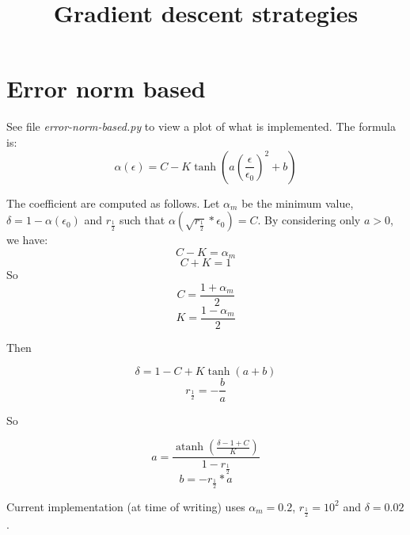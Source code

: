 \documentclass {article}
\title {Gradient descent strategies}
\newcommand{\rhalf}{r_{\frac{1}{2}}}
\newcommand{\atanh}{\operatorname{atanh}}
\begin{document}
\maketitle

\section {Error norm based}

See file \emph{error-norm-based.py} to view a plot of what is implemented.
The formula is:
$$
\alpha (\epsilon) = C - K \tanh{\left(a \left(\frac{\epsilon}{\epsilon_0}\right)^2 + b \right)}
$$

The coefficient are computed as follows. Let $\alpha_m$ be the minimum value,
$\delta = 1 - \alpha(\epsilon_0)$ and $\rhalf$ such that $\alpha(\sqrt{\rhalf} * \epsilon_0) = C$.
By considering only $a > 0$, we have:
$$ C - K = \alpha_m $$
$$ C + K = 1        $$
So
$$ C = \frac{1+\alpha_m}{2} $$
$$ K = \frac{1-\alpha_m}{2} $$

Then

$$ \delta = 1 - C + K \tanh (a+b) $$
$$ \rhalf = - \frac{b}{a} $$

So

$$ a = \frac{ \atanh \left( \frac{\delta - 1 + C}{K} \right)}{ 1 - \rhalf } $$
$$ b = - \rhalf * a $$

Current implementation (at time of writing) uses $\alpha_m = 0.2$, $\rhalf = 10^2$ and $\delta = 0.02$.
\end{document}
